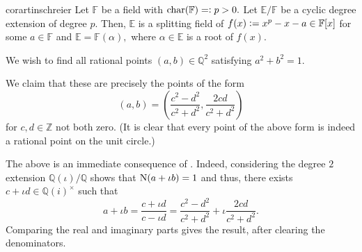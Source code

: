 \begin{restatable}{cor}{artinschreier}
\label{cor:artinschreier}
	Let $\mathbb{F}$ be a field with $\operatorname{char}(\mathbb{F}) =\vcentcolon p > 0.$ Let $\mathbb{E}/\mathbb{F}$ be a cyclic degree extension of degree $p.$ Then, $\mathbb{E}$ is a splitting field of $f(x) \vcentcolon= x^p - x - a \in \mathbb{F}[x]$ for some $a \in \mathbb{F}$ and $\mathbb{E} = \mathbb{F}(\alpha),$ where $\alpha \in \mathbb{E}$ is a root of $f(x).$ \hfill\hyperref[cor:artinschreier2]{\downsym}
\end{restatable}

\begin{ex}
	We wish to find all rational points $(a, b) \in \mathbb{Q}^2$ satisfying $a^2 + b^2 = 1.$ 

	We claim that these are precisely the points of the form
	\begin{equation*} 
		(a, b) = \left(\frac{c^2 - d^2}{c^2 + d^2}, \frac{2cd}{c^2 + d^2}\right)
	\end{equation*}
	for $c, d \in \mathbb{Z}$ not both zero. (It is clear that every point of the above form is indeed a rational point on the unit circle.)

	The above is an immediate consequence of . Indeed, considering the degree $2$ extension $\mathbb{Q}(\iota)/\mathbb{Q}$ shows that $\operatorname{N}(a + \iota b) = 1$ and thus, there exists $c + \iota d \in \mathbb{Q}(i)^\times$ such that
	\begin{equation*} 
		a + \iota b = \frac{c + \iota d}{c - \iota d} = \frac{c^2 - d^2}{c^2 + d^2} + \iota \frac{2cd}{c^2 + d^2}.
	\end{equation*}
	Comparing the real and imaginary parts gives the result, after clearing the denominators.
\end{ex}